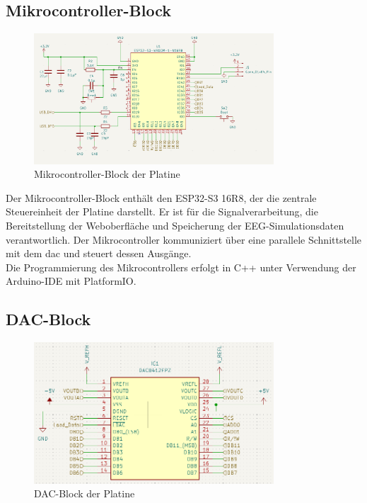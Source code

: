 \subsection{Mikrocontroller-Block}
\begin{figure}[H]
    \centering
    \includegraphics[width=0.8\textwidth]{bilder/Mikrocontroller_Block.png}
    \caption{Mikrocontroller-Block der Platine}
    \label{fig:mikrocontroller_block}
\end{figure}

Der Mikrocontroller-Block enthält den ESP32-S3 16R8, der die zentrale Steuereinheit der Platine darstellt. Er ist für die Signalverarbeitung, die Bereitstellung der Weboberfläche und Speicherung der EEG-Simulationsdaten verantwortlich. Der Mikrocontroller kommuniziert über eine parallele Schnittstelle mit dem \gls{dac} und steuert dessen Ausgänge.\\
Die Programmierung des Mikrocontrollers erfolgt in C++ unter Verwendung der Arduino-IDE mit PlatformIO. 

\subsection{DAC-Block}
\begin{figure}[H]
    \centering
    \includegraphics[width=0.8\textwidth]{bilder/DAC.png}
    \caption{DAC-Block der Platine}
    \label{fig:dac_block}
\end{figure}

